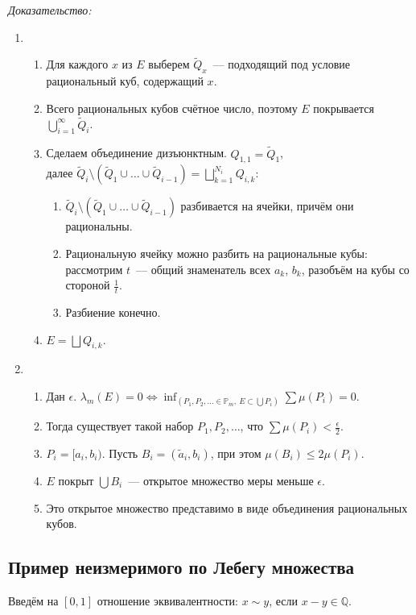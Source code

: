 \documentclass[paper=a4, fontsize=11pt]{article}
\begin{document}
\emph{Доказательство:}
\begin{enumerate}
    \item
    \begin{enumerate}
        \item Для каждого $x$ из $E$ выберем $\widetilde{Q}_x$~--- подходящий под условие рациональный куб, содержащий $x$.
        \item Всего рациональных кубов счётное число, поэтому $E$ покрывается $\bigcup_{i=1}^{\infty} \widetilde{Q}_i$.
        \item Сделаем объединение дизъюнктным. $Q_{1,1} = \widetilde{Q}_1$,\\
        далее $\widetilde{Q}_i \setminus (\widetilde{Q}_1 \cup \dots \cup \widetilde{Q}_{i-1}) =
        \bigsqcup_{k=1}^{N_i} Q_{i,k}$:
        \begin{enumerate}
            \item $\widetilde{Q}_i \setminus (\widetilde{Q}_1 \cup \dots \cup \widetilde{Q}_{i-1})$ разбивается на ячейки,
            причём они рациональны.
            \item Рациональную ячейку можно разбить на рациональные кубы: рассмотрим $t$~--- общий знаменатель всех $a_k$, $b_k$,
            разобъём на кубы со стороной $\frac{1}{t}$.
            \item Разбиение конечно.
        \end{enumerate}
        \item $E = \bigsqcup Q_{i,k}$.
    \end{enumerate}
    \item
    \begin{enumerate}
        \item Дан $\epsilon$. $\lambda_m(E) = 0 \Leftrightarrow
        \inf_{(P_1,P_2,\dots \in \mathds{P}_m,\ E \subset \bigcup P_i)} \sum \mu(P_i) = 0$.
        \item Тогда существует такой набор $P_1,P_2,\dots$, что $\sum \mu(P_i) < \frac{\epsilon}{2}$.
        \item $P_i = [a_i,b_i)$. Пусть $B_i = (\widetilde{a}_i,b_i)$, при этом $\mu(B_i) \leq 2\mu(P_i)$.
        \item $E$ покрыт $\bigcup B_i$~--- открытое множество меры меньше $\epsilon$.
        \item Это открытое множество представимо в виде объединения рациональных кубов.
    \end{enumerate}
\end{enumerate}

\subsection{Пример неизмеримого по Лебегу множества}
Введём на $[0,1]$ отношение эквивалентности: $x \sim y$, если $x-y \in \mathds{Q}$.
\end{document}
